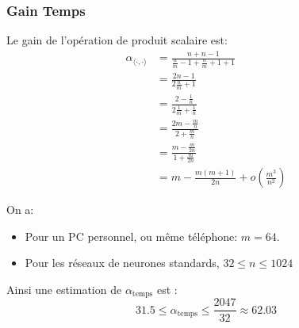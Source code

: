 \subsubsection{Gain Temps}
Le gain de l'opération de produit scalaire est:
\begin{align*}
\alpha_{\langle \cdot , \cdot \rangle} &= \frac{n+n-1}{\frac{n}{m}-1+\frac{n}{m}+1+1}  \\
&= \frac{2n-1}{2\frac{n}{m}+1} \\
&= \frac{2-\frac{1}{n}}{2\frac{1}{m}+\frac{1}{n}} \\
&= \frac{2m-\frac{m}{n}}{2+\frac{m}{n}} \\
&= \frac{m-\frac{m}{2n}}{1+\frac{m}{2n}}\\
&= m -\frac{m(m+1)}{2n} + o\left(\frac{m^3}{n^2}\right)
\end{align*}

On a:
\begin{itemize}
	\item Pour un PC personnel, ou même téléphone: $m=64.$
	\item Pour les réseaux de neurones standards, $32\leq n\leq 1024$
\end{itemize}

Ainsi une estimation de $\alpha_{\text{temps}}$ est :
$$
31.5\leq \alpha_{\text{temps}} \leq \frac{2047}{32} \approx 62.03
$$